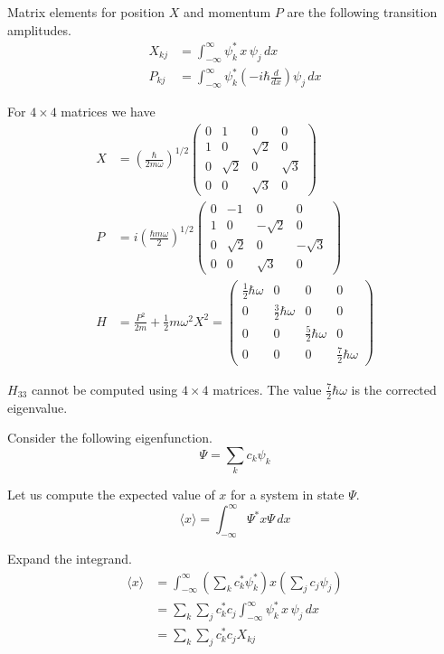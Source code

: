 \documentclass[12pt]{article}
\begin{document}
\noindent
Matrix elements for position $X$ and momentum $P$ are the following transition amplitudes.
\begin{align*}
X_{kj}&=\int_{-\infty}^\infty \psi_k^*\,x\,\psi_j\,dx
\\[1ex]
P_{kj}&=\int_{-\infty}^\infty \psi_k^*\left(-i\hbar\frac{d}{dx}\right)\psi_j\,dx
\end{align*}

\noindent
For $4\times4$ matrices we have
\begin{align*}
X&=\left(\frac{\hbar}{2m\omega}\right)^{1/2}
\begin{pmatrix}
0 & 1 & 0 & 0
\\
1 & 0 & \sqrt{2} & 0
\\
0 & \sqrt{2} & 0 & \sqrt{3}
\\
0 & 0 & \sqrt{3} & 0
\end{pmatrix}
\\[1ex]
P&=i\left(\frac{\hbar m\omega}{2}\right)^{1/2}
\begin{pmatrix}
0 & -1 & 0 & 0
\\
1 & 0 & -\sqrt{2} & 0
\\
0 & \sqrt{2} & 0 & -\sqrt{3}
\\
0 & 0 & \sqrt{3} & 0
\end{pmatrix}
\\[1ex]
H&=\frac{P^2}{2m}+\frac{1}{2}m\omega^2 X^2
=\begin{pmatrix}
\tfrac{1}{2}\hbar\omega & 0 & 0 & 0
\\
0 & \tfrac{3}{2}\hbar\omega & 0 & 0
\\
0 & 0 & \tfrac{5}{2}\hbar\omega & 0
\\
0 & 0 & 0 & \tfrac{7}{2}\hbar\omega
\end{pmatrix}
\end{align*}

\noindent
$H_{33}$ cannot be computed using $4\times4$ matrices.
The value $\tfrac{7}{2}\hbar\omega$ is the corrected eigenvalue.

\bigskip
\noindent
Consider the following eigenfunction.
\begin{equation*}
\Psi=\sum_k c_k\psi_k
\end{equation*}

\noindent
Let us compute the expected value of $x$ for a system in state $\Psi$.
\begin{equation*}
\langle x\rangle=\int_{-\infty}^\infty \Psi^* x\Psi\,dx
\end{equation*}

\noindent
Expand the integrand.
\begin{align*}
\langle x\rangle
&=\int_{-\infty}^\infty
\left(\sum_kc_k^*\psi_k^*\right) x \left(\sum_j c_j\psi_j\right)
\\
&=\sum_k\sum_jc_k^*c_j\int_{-\infty}^\infty\psi_k^*\,x\,\psi_j\,dx
\\
&=\sum_k\sum_jc_k^*c_j X_{kj}
\end{align*}
\end{document}
